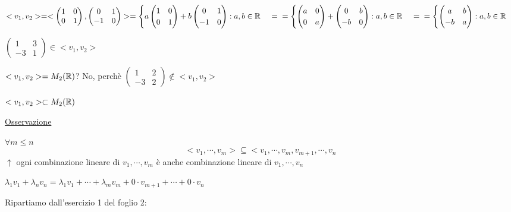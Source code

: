 \documentclass{article}
\begin{document}
  $<v_1,v_2>=<\begin{pmatrix}1&0\\0&1\end{pmatrix},\begin{pmatrix}0&1\\-1&0\end{pmatrix}>=\begin{cases}a\begin{pmatrix}1&0\\0&1\end{pmatrix}+b\begin{pmatrix}0&1\\-1&0\end{pmatrix}:a,b\in\mathbb{R}\end{cases}=\\=\begin{cases}\begin{pmatrix}a&0\\0&a\end{pmatrix}+\begin{pmatrix}0&b\\-b&0\end{pmatrix}:a,b\in\mathbb{R}\end{cases}=\\=\begin{cases}\begin{pmatrix}a&b\\-b&a\end{pmatrix}:a,b\in\mathbb{R}\end{cases}$

  $\begin{pmatrix}1&3\\-3&1\end{pmatrix}\in<v_1,v_2>$

  $<v_1,v_2>=M_2(\mathbb{R})$? No, perchè $\begin{pmatrix}1&2\\-3&2\end{pmatrix}\not\in<v_1,v_2>$

  $<v_1,v_2>\subset M_2(\mathbb{R})$

  \ul{Osservazione}

  $\forall m\leq n$
  $$<v_1,\cdots,v_m>\subseteq <v_1,\cdots,v_m,v_{m+1},\cdots,v_n$$
  $\uparrow$ ogni combinazione lineare di $v_1,\cdots,v_m$ è anche combinazione lineare di $v_1,\cdots,v_n$

  $\lambda_1v_1+\lambda_nv_n=\lambda_1v_1+\cdots+\lambda_mv_m+0\cdot v_{m+1}+\cdots+0\cdot v_n$

Ripartiamo dall'esercizio 1 del foglio 2:
\end{document}
